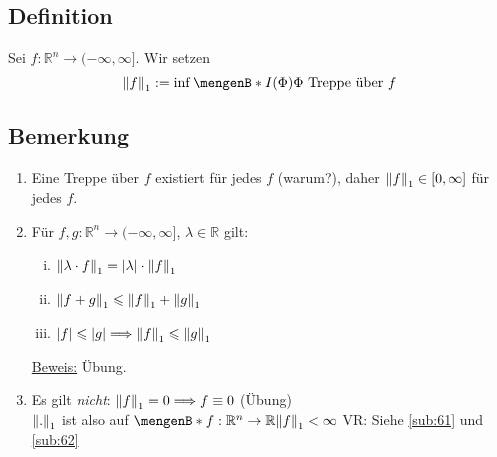 \subsection[Definition: $L^1$-Halbnorm]{Definition} %
\label{sub:37}
Sei $f : \mathds{R}^n \to (-\infty, \infty]$. Wir setzen 
\[
	\norm[1]{f} :=  \inf \set[I(\Phi)]{\Phi \text{ Treppe über }f } 
\]

\subsection[Bemerkungen zur $L^1$-Halbnorm]{Bemerkung} %
\label{sub:38}
\begin{enumerate}[1.]
	\item Eine Treppe über $f$ existiert für jedes $f$ (warum?), daher $\norm[1]{f} \in [0, \infty] $ für jedes $f$.
	\item Für $f,g : \mathds{R}^n \to (- \infty, \infty]$, $\lambda  \in \mathds{R}$ gilt:
	\begin{enumerate}[(i)]
		\item $\norm[1]{\lambda  \cdot f}  = \abs*{\lambda } \cdot  \norm[1]{f}  $
		\item $\norm[1]{f+g} \le \norm[1]{f} + \norm[1]{g}   $
		\item $\abs*{f} \le \abs*{g} \Longrightarrow \norm[1]{f} \le \norm[1]{g}   $
	\end{enumerate}
	\uline{Beweis:} Übung.
	\item Es gilt \emph{nicht}: $\norm[1]{f} = 0 \Longrightarrow f \equiv 0 $ (Übung)\\
	$\norm[1]{.} $ ist also  auf $\set[f : \mathds{R}^n \to \mathds{R}]{\norm[1]{f} < \infty } $ VR: Siehe \ref{sub:61} und \ref{sub:62}
\end{enumerate}

